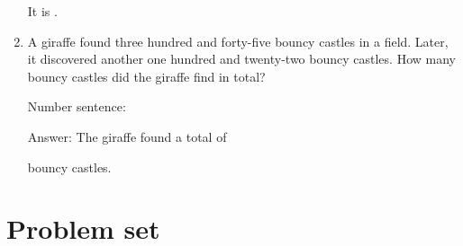 \documentclass{tufte-book}
\begin{document}
\begin{enumerate}
It is \dotfill\medskip.

\item A giraffe found three hundred and forty-five bouncy castles in a field. Later, it discovered another one hundred and twenty-two bouncy castles. How many bouncy castles did the giraffe find in total?

Number sentence: \dotfill\medskip

Answer: The giraffe found a total of
\dotfill\medskip\par\mbox{}\dotfill\medskip\par\mbox{}\dotfill\bigskip
bouncy castles.

\end{enumerate}



\clearpage\section{Problem set }
\end{document}
